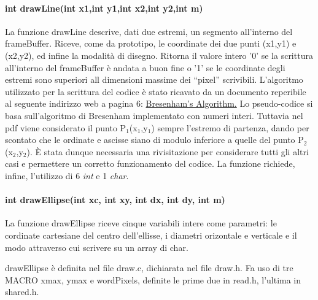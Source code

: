 \documentclass{article}
\begin{document}
		\paragraph{int drawLine(int x1,int y1,int x2,int y2,int m)}
                La funzione drawLine descrive, dati due estremi, un segmento all'interno del frameBuffer.
                \newline
                Riceve, come da prototipo, le coordinate dei due punti (x1,y1) e (x2,y2), ed infine la modalità di disegno.
                Ritorna il valore intero '0' se la scrittura all'interno del frameBuffer è andata a buon fine o '1' se le coordinate degli estremi sono superiori all dimensioni massime dei ``pixel'' scrivibili.
                L'algoritmo utilizzato per la scrittura del codice è stato ricavato da un documento reperibile al seguente indirizzo web a pagina 6:
                \href{http://www.idav.ucdavis.edu/education/GraphicsNotes/Bresenhams-Algorithm.pdf}{Bresenham's Algorithm.}\newline
                Lo pseudo-codice si basa sull'algoritmo di Bresenham implementato con numeri interi.
                Tuttavia nel pdf viene considerato il punto P$_{1}$(x$_{1}$,y$_{1}$) sempre l'estremo di partenza, dando per scontato che le ordinate e ascisse siano di modulo inferiore a quelle del punto P$_{2}$(x$_{2}$,y$_{2}$).
                È stata dunque necessaria una rivisitazione per considerare tutti gli altri casi e permettere un corretto funzionamento del codice.
                La funzione richiede, infine, l'utilizzo di 6 \textit{int} e 1 \textit{char}.
		\paragraph{int drawEllipse(int xc, int xy, int dx, int dy, int m)}
		La funzione drawEllipse riceve cinque variabili intere come parametri:
                le cordinate cartesiane del centro dell'ellisse, i diametri orizontale e verticale e il modo attraverso cui scrivere su un array di char.
		
		drawEllipse è definita nel file draw.c, dichiarata nel file draw.h.
                Fa uso di tre MACRO  xmax, ymax e wordPixels, definite le prime due in read.h, l'ultima in shared.h.
		
\end{document}
